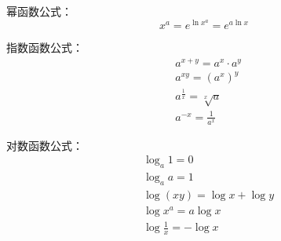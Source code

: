 幂函数公式：
\[
x^a=e^{\ln x^a}=e^{a\ln x}
\]

指数函数公式：
\begin{align*}
&a^{x+y}=a^x\cdot a^y \\
&a^{xy}=\left( a^x \right) ^y \\
&a^{\frac{1}{x}}=\sqrt[x]{a} \\
&a^{-x}=\frac{1}{a^x}
\end{align*}

对数函数公式：
\begin{align*}
&\log _a1=0 \\
&\log _aa=1 \\
&\log \left( xy \right) =\log x+\log y \\
&\log x^a=a\log x \\
&\log \frac{1}{x}=-\log x
\end{align*}




